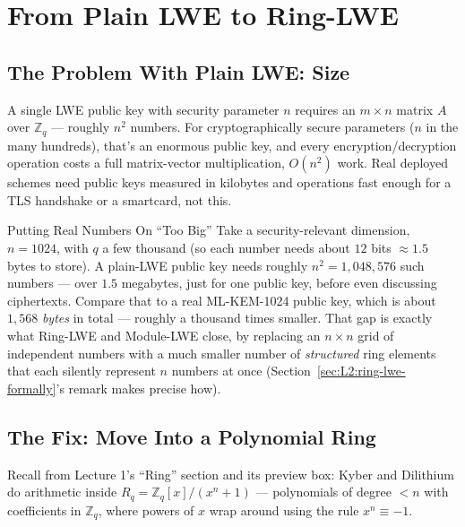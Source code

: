 \section{From Plain LWE to Ring-LWE}
\label{sec:L2:from-plain-lwe-to-ring-lwe}

\subsection{The Problem With Plain LWE: Size}
\label{sec:L2:the-problem-with-plain-lwe-size}

A single LWE public key with security parameter $n$ requires an $m \times n$ matrix $A$ over $\mathbb{Z}_q$ --- roughly $n^2$ numbers. For cryptographically secure parameters ($n$ in the many hundreds), that's an enormous public key, and every encryption/decryption operation costs a full matrix-vector multiplication, $O(n^2)$ work. Real deployed schemes need public keys measured in kilobytes and operations fast enough for a TLS handshake or a smartcard, not this.

\begin{exbox}{Putting Real Numbers On ``Too Big''}
Take a security-relevant dimension, $n=1024$, with $q$ a few thousand (so each number needs about $12$ bits $\approx 1.5$ bytes to store). A plain-LWE public key needs roughly $n^2 = 1{,}048{,}576$ such numbers --- over $1.5$ megabytes, just for one public key, before even discussing ciphertexts. Compare that to a real ML-KEM-1024 public key, which is about $1{,}568$ \emph{bytes} in total --- roughly a thousand times smaller. That gap is exactly what Ring-LWE and Module-LWE close, by replacing an $n\times n$ grid of independent numbers with a much smaller number of \emph{structured} ring elements that each silently represent $n$ numbers at once (Section~\ref{sec:L2:ring-lwe-formally}'s remark makes precise how).
\end{exbox}

\subsection{The Fix: Move Into a Polynomial Ring}
\label{sec:L2:the-fix-move-into-a-polynomial-ring}

Recall from Lecture 1's ``Ring'' section and its preview box: Kyber and Dilithium do arithmetic inside $R_q = \mathbb{Z}_q[x]/(x^n+1)$ --- polynomials of degree $< n$ with coefficients in $\mathbb{Z}_q$, where powers of $x$ wrap around using the rule $x^n \equiv -1$.

